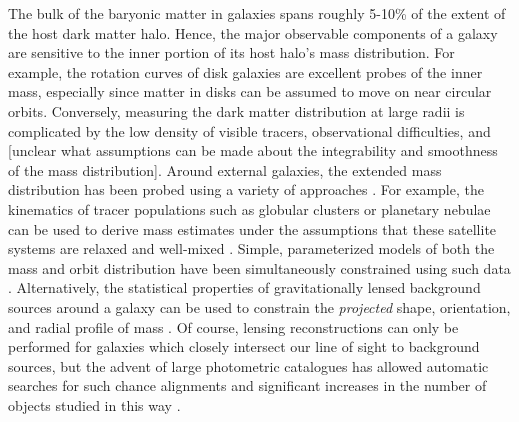 \documentclass[letterpaper,12pt,preprint]{aastex}
\begin{document}
The bulk of the baryonic matter in galaxies spans roughly 5-10\% of the extent of the host dark matter halo. Hence, the major observable components of a galaxy are sensitive to the inner portion of its host halo's mass distribution. For example, the rotation curves of disk galaxies are excellent probes of the inner mass, especially since matter in disks can be assumed to move on near circular orbits. Conversely, measuring the dark matter distribution at large radii is complicated by the low density of visible tracers, observational difficulties, and [unclear what assumptions can be made about the integrability and smoothness of the mass distribution]. Around external galaxies, the extended mass distribution has been probed using a variety of approaches \citep[see][for a a complete and detailed review]{courteau13}. For example, the kinematics of tracer populations such as globular clusters or planetary nebulae can be used to derive mass estimates under the assumptions that these satellite systems are relaxed and well-mixed \citep[early investigations include][]{mendez01,cote03}. Simple, parameterized models of both the mass and orbit distribution have been simultaneously constrained using such data \citep[e.g.][]{napolitano11,deason12c}. 
Alternatively, the statistical properties of gravitationally lensed background sources around a galaxy can be used to constrain the \emph{projected} shape, orientation, and radial profile of mass \citep[as done by the Lens Structure and Dynamics Survey described in][]{koopmans02}. Of course, lensing reconstructions can only be performed for galaxies which closely intersect our line of sight to background sources, but the advent of large photometric catalogues has allowed automatic searches for such chance alignments and significant increases in the number of objects studied in this way \citep[e.g. the Sloan Lens ACS Survey, see][]{bolton06}.
\end{document}
